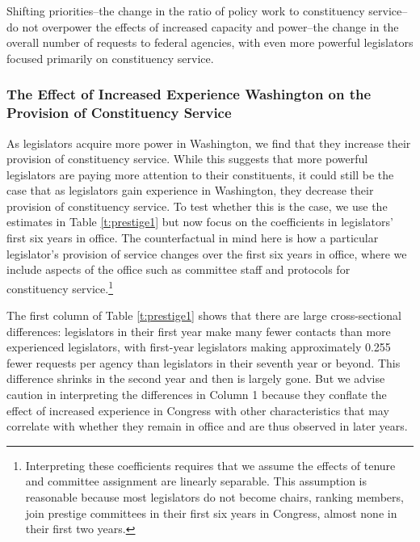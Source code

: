 \documentclass[12pt]{article}
\begin{document}
Shifting priorities--the change in the ratio of policy work to constituency service--do not overpower the effects of increased capacity and power--the change in the overall number of requests to federal agencies, with even more powerful legislators focused primarily on constituency service. 

\subsubsection{The Effect of Increased Experience Washington on the Provision of Constituency Service}\label{s:tenure} %

As legislators acquire more power in Washington, we find that they increase their provision of constituency service. While this suggests that more powerful legislators are paying more attention to their constituents, it could still be the case that as legislators gain experience in Washington, they decrease their provision of constituency service. To test whether this is the case, we use the estimates in Table \ref{t:prestige1} but now focus on the coefficients in legislators' first six years in office. The counterfactual in mind here is how a particular legislator's provision of service changes over the first six years in office, where we include aspects of the office such as committee staff and protocols for constituency service.\footnote{Interpreting these coefficients requires that we assume the effects of tenure and committee assignment are linearly separable. This assumption is reasonable because most legislators do not become chairs, ranking members, join prestige committees in their first six years in Congress, almost none in their first two years.} 


The first column of Table \ref{t:prestige1} shows that there are large cross-sectional differences: legislators in their first year make many fewer contacts than more experienced legislators, with first-year legislators making approximately 0.255 fewer requests per agency than legislators in their seventh year or beyond. This difference shrinks in the second year and then is largely gone. But we advise caution in interpreting the differences in Column 1 because they conflate the effect of increased experience in Congress with other characteristics that may correlate with whether they remain in office and are thus observed in later years.   


\end{document}
